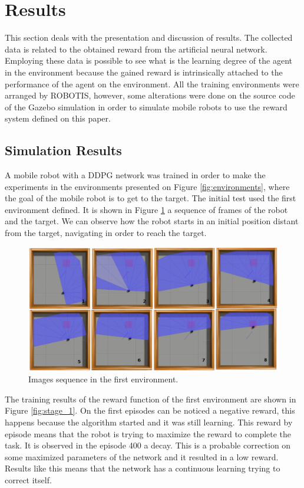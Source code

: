\section*{Results}

This section deals with the presentation and discussion of results.
The collected data is related to the obtained reward from the artificial neural network.
Employing these data is possible to see what is the learning degree of the agent in the environment because the gained reward is intrinsically attached to the performance of the agent on the environment.
All the training environments were arranged by ROBOTIS, however, some alterations were done on the source code of the Gazebo simulation in order to simulate mobile robots to use the reward system defined on this paper.

\subsection*{Simulation Results}

A mobile robot with a DDPG network was trained in order to make the experiments in the environments presented on {\color{blue}Figure} \ref{fig:environments}, where the goal of the mobile robot is to get to the target.
The initial test used the first environment defined. It is shown in {\color{blue}Figure} \ref{fig:amb1target} a sequence of frames of the robot and the target. 
We can observe how the robot starts in an initial position distant from the target, navigating in order to reach the target.

\begin{figure}[H]
\centerline{\includegraphics[width=\columnwidth]{images/amb1target.png}}
\caption{Images sequence in the first environment.}
\label{fig:amb1target}
\end{figure}

The training results of the reward function of the first environment are shown in {\color{blue}Figure} \ref{fig:stage_1}.
On the first episodes can be noticed a negative reward, this happens because the algorithm started and it was still learning. 
This reward by episode means that the robot is trying to maximize the reward to complete the task. 
It is observed in the episode 400 a decay. 
This is a probable correction on some maximized parameters of the network and it resulted in a low reward.
Results like this means that the network has a continuous learning trying to correct itself. 

